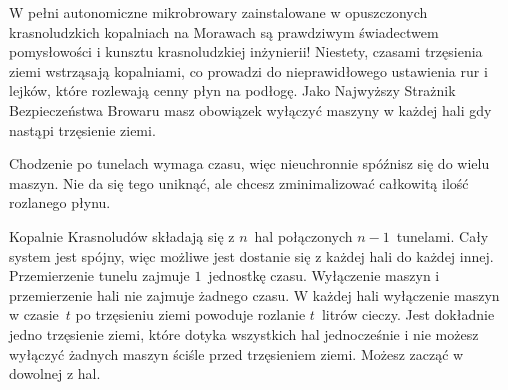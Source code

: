 
\noindent
W pełni autonomiczne mikrobrowary zainstalowane w opuszczonych krasnoludzkich kopalniach na Morawach są prawdziwym świadectwem pomysłowości i kunsztu krasnoludzkiej inżynierii!
Niestety, czasami trzęsienia ziemi wstrząsają kopalniami, co prowadzi do nieprawidłowego ustawienia rur i lejków, które rozlewają cenny płyn na podłogę.
Jako Najwyższy Strażnik Bezpieczeństwa Browaru masz obowiązek wyłączyć maszyny w każdej hali gdy nastąpi trzęsienie ziemi.

Chodzenie po tunelach wymaga czasu, 
więc nieuchronnie spóźnisz się do wielu maszyn.
Nie da się tego uniknąć, ale chcesz zminimalizować całkowitą ilość rozlanego płynu.

\medskip
Kopalnie Krasnoludów składają się z $n$~hal połączonych $n-1$~tunelami.
Cały system jest spójny, więc możliwe jest dostanie się z każdej hali do każdej innej.
Przemierzenie tunelu zajmuje $1$~jednostkę czasu.
Wyłączenie maszyn i przemierzenie hali nie zajmuje żadnego czasu.
W każdej hali wyłączenie maszyn w czasie~$t$ po trzęsieniu ziemi powoduje rozlanie $t$~litrów cieczy.
Jest dokładnie jedno trzęsienie ziemi, które dotyka wszystkich hal jednocześnie i nie możesz wyłączyć żadnych maszyn ściśle przed trzęsieniem ziemi.
Możesz zacząć w dowolnej z hal.


